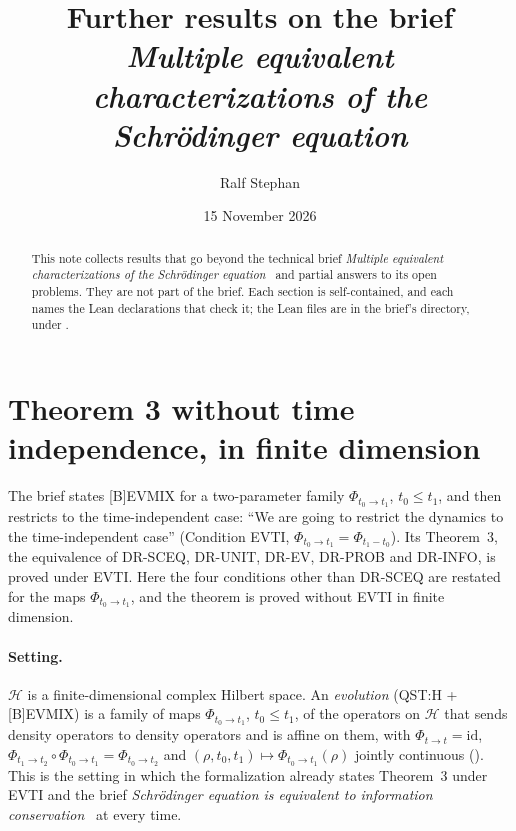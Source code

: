\documentclass[11pt]{article}
\title{Further results on the brief\\ \emph{Multiple equivalent characterizations of the
  Schr\"odinger equation}}
\author{Ralf Stephan}
\date{15 November 2026}
\theoremstyle{definition}
\begin{document}
\maketitle

\begin{abstract}
  This note collects results that go beyond the technical brief \emph{Multiple equivalent
  characterizations of the Schr\"odinger equation}~\cite{brief} and partial answers to its open
  problems. They are not part of the brief. Each section is self-contained, and each names the
  Lean declarations that check it; the Lean files are in the brief's directory, under
  .
\end{abstract}

\section{Theorem 3 without time independence, in finite dimension}
\label{sec:time-dependent}

The brief states [B]EVMIX for a two-parameter family $\Phi_{t_0\to t_1}$, $t_0 \le t_1$, and
then restricts to the time-independent case: ``We are going to restrict the dynamics to the
time-independent case'' (Condition EVTI, $\Phi_{t_0\to t_1} = \Phi_{t_1-t_0}$). Its Theorem~3,
the equivalence of DR-SCEQ, DR-UNIT, DR-EV, DR-PROB and DR-INFO, is proved under EVTI. Here the
four conditions other than DR-SCEQ are restated for the maps $\Phi_{t_0\to t_1}$, and the theorem
is proved without EVTI in finite dimension.

\paragraph{Setting.} $\mathcal H$ is a finite-dimensional complex Hilbert space. An
\emph{evolution} (QST:H + [B]EVMIX) is a family of maps $\Phi_{t_0\to t_1}$, $t_0 \le t_1$, of the
operators on $\mathcal H$ that sends density operators to density operators and is affine on
them, with $\Phi_{t\to t} = \mathrm{id}$, $\Phi_{t_1\to t_2}\circ\Phi_{t_0\to t_1} =
\Phi_{t_0\to t_2}$ and $(\rho, t_0, t_1) \mapsto \Phi_{t_0\to t_1}(\rho)$ jointly continuous
(). This is the setting in which the
formalization already states Theorem~3 under EVTI and the brief \emph{Schr\"odinger equation is
equivalent to information conservation}~\cite{info} at every time.
\end{document}
